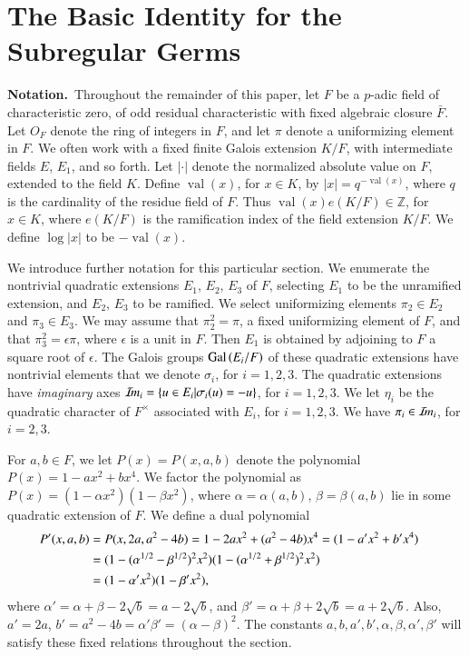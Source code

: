 \documentclass{amsart}
\newcommand\Z{{\mathbb Z}}
\newcommand\Gal{\hbox{Gal\,}}
\newcommand\Imm{{\mathcal I\hskip-.2em m}}
\newcommand\bF{{\bar F}}
\newcommand\val{\operatorname{val}}
\begin{document}
\section{The Basic Identity for the Subregular Germs}

\noindent
{\bf Notation.}\  
Throughout the remainder of this paper,
let $F$ be a $p$-adic field of characteristic
zero, of odd residual characteristic with fixed
algebraic closure $\bF$.  Let $O_F$
denote the ring of integers in $F$, and let $\pi$ denote
a uniformizing element in $F$.
We often work with
a fixed finite Galois extension $K/F$, with intermediate
fields $E$, $E_1$, and so forth. 
Let $|\cdot|$ denote
the normalized absolute value on $F$, extended to the
field $K$.  Define $\val(x)$, for $x\in K$, by $|x| = q^{-\val(x)}$,
where $q$ is the cardinality of the residue field of $F$.  
Thus $\val(x) e(K/F) \in \Z$, for $x\in K$, 
where $e(K/F)$ is the
ramification index of the field extension $K/F$.  We define
$\log|x|$ to be $-\val(x)$.

We introduce further notation for this particular section.
We enumerate the
nontrivial quadratic extensions $E_1$, $E_2$, $E_3$ of $F$,
selecting $E_1$ to be the unramified extension, and $E_2$, $E_3$
to be ramified.  We select uniformizing elements $\pi_2\in E_2$
and $\pi_3\in E_3$.  We may assume that $\pi_2^2 = \pi$, a fixed
uniformizing element of $F$, and that $\pi_3^2 = \epsilon\pi$,
where $\epsilon$ is a unit in $F$.  Then $E_1$ is obtained by
adjoining to $F$ a square root of $\epsilon$.  The Galois
groups $\Gal(E_i/F)$ of these quadratic extensions have nontrivial
elements that we denote $\sigma_i$, for $i=1,2,3$.  The quadratic
extensions have {\it imaginary} axes $\Imm_i = \{u\in E_i| \sigma_i(u) = -u\}$,
for $i=1,2,3$.  We let $\eta_i$ be the 
quadratic character of $F^\times$
associated with $E_i$, for $i=1,2,3$.  We have $\pi_i\in \Imm_i$,
for $i=2,3$.

For $a,b\in F$, we let $P(x) = P(x,a,b)$ denote the polynomial
$P(x) = 1-ax^2 + bx^4$.  We factor the polynomial as
$P(x) = (1-\alpha x^2)(1-\beta x^2)$, where $\alpha=\alpha(a,b)$,
$\beta=\beta(a,b)$ lie in some quadratic extension of $F$.
We define a dual polynomial 
\begin{align*}
P'(x,a,b) &= P(x,2a,a^2-4b) = 1-2ax^2 + (a^2-4b)x^4 = (1-a'x^2 + b'x^4)\cr
	  &= (1-(\alpha^{1/2} - \beta^{1/2})^2x^2)
                (1-(\alpha^{1/2}+\beta^{1/2})^2x^2)\cr
	  &= (1-\alpha'x^2)(1-\beta'x^2),
\end{align*}
where $\alpha' = \alpha+\beta-2\sqrt{b} = a-2\sqrt{b}$, and
$\beta' = \alpha+\beta+2\sqrt{b} = a+2\sqrt{b}$.  Also,
$a'=2a$, $b'=a^2-4b = \alpha'\beta'=(\alpha-\beta)^2$.
The constants $a,b,a',b',\alpha,\beta,\alpha',\beta'$ will 
satisfy these fixed relations throughout the section.
\end{document}
